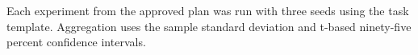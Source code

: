 Each experiment from the approved plan was run with three seeds using the task template. Aggregation uses the sample standard deviation and t-based ninety-five percent confidence intervals.
